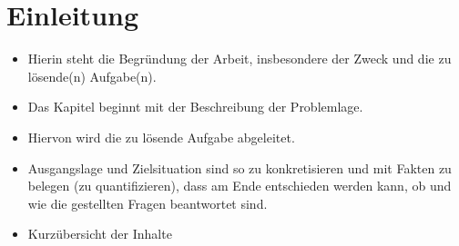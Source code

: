 
\chapter{Einleitung}

\label{Chapter1}

\begin{itemize}
  \item Hierin steht die Begründung der Arbeit, insbesondere der Zweck und die zu lösende(n) Aufgabe(n).
  \item Das Kapitel beginnt mit der Beschreibung der Problemlage.
  \item Hiervon wird die zu lösende Aufgabe abgeleitet.
  \item Ausgangslage und Zielsituation sind so zu konkretisieren und mit Fakten zu belegen (zu quantifizieren), dass am Ende entschieden werden kann, ob und wie die gestellten Fragen beantwortet sind.
  \item Kurzübersicht der Inhalte
\end{itemize}
